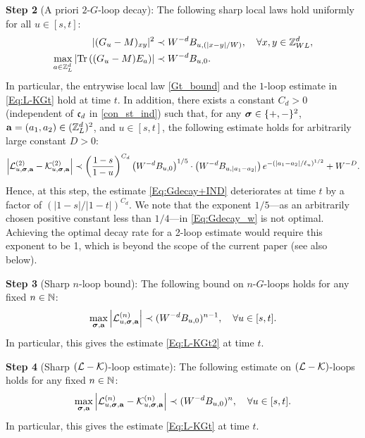  
 \noindent 
\textbf{Step 2}  (A priori $2$-$G$-loop decay): 
The following sharp local laws hold uniformly for all $u\in [s,t]$: 
 \begin{align}\label{Gt_bound_flow}
     |(G_u-M)_{xy}|^2&\prec W^{-d}B_{u,(|x-y|/W)},\quad \forall x,y\in \ZL, \\
     \label{Gt_avgbound_flow} 
    \max_{a\in \Zn}\left|\tr\p{(G_u-M)E_a}\right| &\prec   W^{-d}B_{u,0}.
\end{align}
In particular, the entrywise local law  \eqref{Gt_bound} and the $1$-loop estimate in \eqref{Eq:L-KGt} hold at time $t$. 
In addition, there exists a constant $C_d>0$ (independent of $\fc_d$ in \eqref{con_st_ind}) such that, for any $\bsig\in\{+,-\}^2$, $\ba=(a_1,a_2)\in(\Zn)^2$, and $u\in[s,t]$, the following estimate holds for arbitrarily large constant $D>0$: 
 \begin{equation}\label{Eq:Gdecay_w}
\left| {\cal L}^{(2)}_{u, \bsig, \mathbf{a}}-{\cal K}^{(2)}_{u, \bsig, \mathbf{a}}\right| \prec \p{\frac{1-s}{1-u}}^{C_d}\p{W^{-d}B_{u, 0}}^{1/5}\cdot \p{W^{-d}B_{u,  |a_1-a_2| }} e^{-\left({| a_1-a_2| }/{\ell_u}\right)^{1/2}} +W^{-D} . 
\end{equation}
Hence, at this step, the estimate \eqref{Eq:Gdecay+IND} deteriorates at time $t$ by a factor of $(|1-s|/|1-t|)^{C_d}$. 
We note that the exponent $1/5$---as an arbitrarily chosen positive constant less than $1/4$---in \eqref{Eq:Gdecay_w} is not optimal. Achieving the optimal decay rate for a 2-loop estimate would require this exponent to be 1, which is beyond the scope of the current paper (see also  below).



\medskip
\noindent 
\textbf{Step 3}  (Sharp $n$-loop bound): 
The following bound on $n$-$G$-loops holds for any fixed $n\in \N$: 
\begin{equation}\label{Eq:LGxb}
\max_{\bsig, \mathbf{a}}\left| {\cal L}^{(n)}_{u, \bsig, \mathbf{a}} \right|
\prec 
  (W^{-d}B_{u, 0})^{n-1} ,\quad \forall u\in[s,t] .
\end{equation}
In particular, this gives the estimate \eqref{Eq:L-KGt2} at time $t$. 

 \medskip
 \noindent 
\textbf{Step 4} (Sharp  $(\cal L - \cal K)$-loop estimate): The following  estimate on $(\cL-\cK)$-loops holds for any fixed $n\in \N$: 
\begin{equation}\label{Eq:L-KGt-flow}
 \max_{\bsig, \mathbf{a}}\left|{\cal L}^{(n)}_{u, \bsig, \mathbf{a}}-{\cal K}^{(n)}_{u, \bsig, \mathbf{a}}\right|\prec (W^{-d}B_{u, 0})^{n},\quad \forall u\in[s,t] .
\end{equation}
In particular, this gives the estimate \eqref{Eq:L-KGt} at time $t$. 


